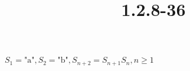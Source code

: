 \documentclass{article}
\title{1.2.8-36}
\begin{document}
\maketitle

\( S_1 = \text{"a"}, S_2 = \text{"b"}, S_{n+2} = S_{n+1}S_n, n \geq 1 \)
\end{document}
